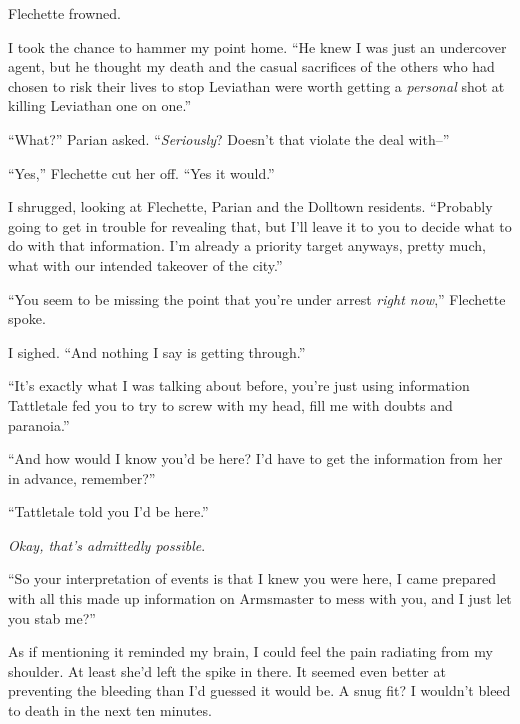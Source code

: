 Flechette frowned.



I took the chance to hammer my point home.  ``He knew I was just an undercover agent, but he thought my death and the casual sacrifices of the others who had chosen to risk their lives to stop Leviathan were worth getting a \emph{personal} shot at killing Leviathan one on one.''



``What?'' Parian asked.  ``\emph{Seriously}?  Doesn't that violate the deal with--''



``Yes,'' Flechette cut her off.  ``Yes it would.''



I shrugged, looking at Flechette, Parian and the Dolltown residents.  ``Probably going to get in trouble for revealing that, but I'll leave it to you to decide what to do with that information.  I'm already a priority target anyways, pretty much, what with our intended takeover of the city.''



``You seem to be missing the point that you're under arrest \emph{right now},'' Flechette spoke.



I sighed.  ``And nothing I say is getting through.''



``It's exactly what I was talking about before, you're just using information Tattletale fed you to try to screw with my head, fill me with doubts and paranoia.''



``And how would I know you'd be here?  I'd have to get the information from her in advance, remember?''



``Tattletale told you I'd be here.''



\emph{Okay, that's admittedly possible}.



``So your interpretation of events is that I knew you were here, I came prepared with all this made up information on Armsmaster to mess with you, and I just let you stab me?''



As if mentioning it reminded my brain, I could feel the pain radiating from my shoulder.  At least she'd left the spike in there.  It seemed even better at preventing the bleeding than I'd guessed it would be.  A snug fit?  I wouldn't bleed to death in the next ten minutes.



